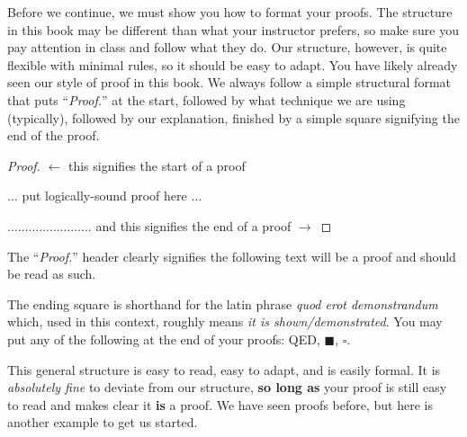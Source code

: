 \documentclass[main.tex]{subfiles}
\begin{document}
Before we continue, we must show you how to format your proofs. The structure in this book may be different than what your instructor prefers, so make sure you pay attention in class and follow what they do. Our structure, however, is quite flexible with minimal rules, so it should be easy to adapt. You have likely already seen our style of proof in this book. We always follow a simple structural format that puts ``\textit{Proof.}'' at the start, followed by what technique we are using (typically), followed by our explanation, finished by a simple square signifying the end of the proof.

\begin{proof}
	\(\leftarrow\) this signifies the start of a proof
	
	\vspace{2em}
	
	\begin{center}
		\(\dots\) put logically-sound proof here \(\dots\)
	\end{center}
	
	\vspace{2em}
	
	\hfill \(\dots \dots \dots \dots \dots \dots \dots \dots \) and this signifies the end of a proof \(\rightarrow\)
\end{proof}

The ``\textit{Proof.}'' header clearly signifies the following text will be a proof and should be read as such.

The ending square is shorthand for the latin phrase \textit{quod erot demonstrandum} which, used in this context, roughly means \textit{it is shown/demonstrated}. You may put any of the following at the end of your proofs: QED, \(\blacksquare\), \(\square\).

This general structure is easy to read, easy to adapt, and is easily formal. It is \textit{absolutely fine} to deviate from our structure, \textbf{so long as} your proof is still easy to read and makes clear it \textbf{is} a proof. We have seen proofs before, but here is another example to get us started.
\end{document}
